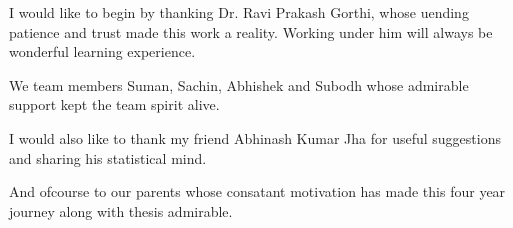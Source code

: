 I would like to begin by thanking Dr. Ravi Prakash Gorthi, whose uending patience and trust made this work a reality. Working under him will always be wonderful learning experience.

We team members Suman, Sachin, Abhishek and Subodh whose admirable support kept the team spirit alive.

I would also like to thank my friend Abhinash Kumar Jha for useful suggestions and sharing his statistical mind.

And ofcourse to our parents whose consatant motivation has made this four year journey along with thesis admirable.